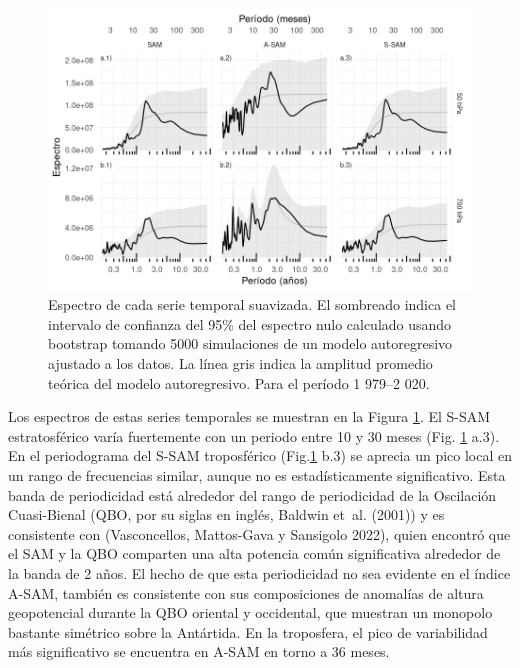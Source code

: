 \documentclass[12pt,oneside,a4paper]{reedthesis}
\begin{document}
\begin{figure}

{\centering \includegraphics{figures/30-sam/spectrum-1} 

}

\caption{Espectro de cada serie temporal suavizada. El sombreado indica el intervalo de confianza del 95\% del espectro nulo calculado usando bootstrap tomando 5000 simulaciones de un modelo autoregresivo ajustado a los datos. La línea gris indica la amplitud promedio teórica del modelo autoregresivo. Para el período 1 979--2 020.}\label{fig:spectrum}
\end{figure}

Los espectros de estas series temporales se muestran en la Figura \ref{fig:spectrum}.
El S-SAM estratosférico varía fuertemente con un periodo entre 10 y 30 meses (Fig. \ref{fig:spectrum} a.3).
En el periodograma del S-SAM troposférico (Fig.\ref{fig:spectrum} b.3) se aprecia un pico local en un rango de frecuencias similar, aunque no es estadísticamente significativo.
Esta banda de periodicidad está alrededor del rango de periodicidad de la Oscilación Cuasi-Bienal (QBO, por su siglas en inglés, Baldwin et~al. (2001)) y es consistente con (Vasconcellos, Mattos-Gava y Sansigolo 2022), quien encontró que el SAM y la QBO comparten una alta potencia común significativa alrededor de la banda de 2 años.
El hecho de que esta periodicidad no sea evidente en el índice A-SAM, también es consistente con sus composiciones de anomalías de altura geopotencial durante la QBO oriental y occidental, que muestran un monopolo bastante simétrico sobre la Antártida.
En la troposfera, el pico de variabilidad más significativo se encuentra en A-SAM en torno a 36 meses.
\end{document}
